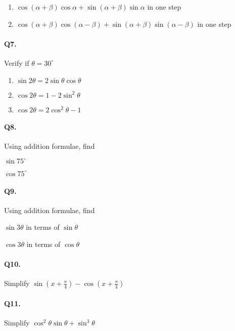 \documentclass{article}
\begin{document}
\begin{enumerate}[label=\roman*)]
  \item $\cos(\alpha+\beta)\cos\alpha + \sin(\alpha+\beta)\sin\alpha$ in one step
  \item $\cos(\alpha+\beta)\cos(\alpha-\beta) + \sin(\alpha+\beta)\sin(\alpha-\beta)$ in one step
\end{enumerate}

\paragraph{Q7.}
Verify if $\theta = 30^{\circ}$

\begin{enumerate}[label=]
  \item $\sin 2\theta = 2\sin\theta\cos\theta$
  \item $\cos 2\theta = 1 - 2\sin^{2}\theta$
  \item $\cos 2\theta = 2\cos^{2}\theta - 1$
\end{enumerate}

\paragraph{Q8.}
Using addition formulae, find

\begin{enumerate*}[label=(\alph*)]
  \item $\sin 75^{\circ}$
  \item $\cos 75^{\circ}$
\end{enumerate*}

\paragraph{Q9.}
Using addition formulae, find

\begin{enumerate*}[label=(\alph*)]
  \item $\sin 3\theta$ in terms of $\sin \theta$
  \item $\cos 3\theta$ in terms of $\cos \theta$
\end{enumerate*}

\paragraph{Q10.}
Simplify $\sin \left( x + \frac{\pi}{4} \right) - \cos \left( x + \frac{\pi}{4} \right)$

\paragraph{Q11.}
Simplify $\cos^{2}\theta \sin\theta + \sin^{3}\theta$
\end{document}
